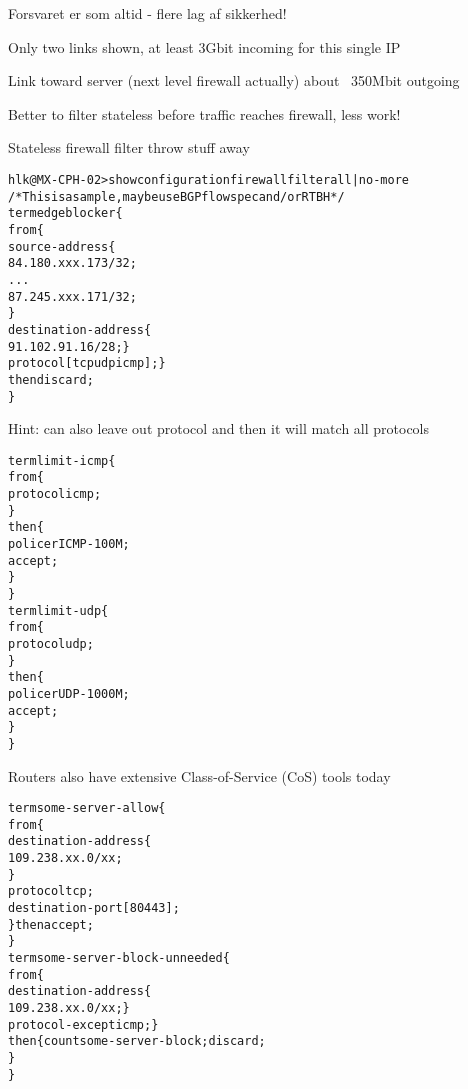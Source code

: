\documentclass[Screen16to9,17pt]{foils}
\begin{document}


\centerline{Forsvaret er som altid - flere lag af sikkerhed! }




\centerline{Only two links shown, at least 3Gbit incoming for this single IP}

\centerline{Link toward server (next level firewall actually) about ~350Mbit outgoing}

Better to filter stateless before traffic reaches firewall, less work!



Stateless firewall filter throw stuff away

\begin{alltt}\footnotesize
hlk@MX-CPH-02> show configuration firewall filter all | no-more
/* This is a sample, maybe use BGP flowspec and/or RTBH */
term edgeblocker \{
    from \{
        source-address \{
            84.180.xxx.173/32;
...
            87.245.xxx.171/32;
        \}
        destination-address \{
            91.102.91.16/28; \}
        protocol [ tcp udp icmp ]; \}
    then discard;
\}
\end{alltt}
Hint: can also leave out protocol and then it will match all protocols


\begin{alltt}\footnotesize
term limit-icmp \{
    from \{
        protocol icmp;
    \}
    then \{
        policer ICMP-100M;
        accept;
    \}
\}
term limit-udp \{
    from \{
        protocol udp;
    \}
    then \{
        policer UDP-1000M;
        accept;
    \}
\}
\end{alltt}

Routers also have extensive Class-of-Service (CoS) tools today


\begin{alltt}\footnotesize
term some-server-allow \{
    from \{
        destination-address \{
            109.238.xx.0/xx;
        \}
        protocol tcp;
        destination-port [ 80 443 ];
    \} then accept;
\}
term some-server-block-unneeded \{
    from \{
        destination-address \{
            109.238.xx.0/xx; \}
        protocol-except icmp;  \}
    then \{ count some-server-block; discard;
    \}
\}
\end{alltt}
\end{document}
